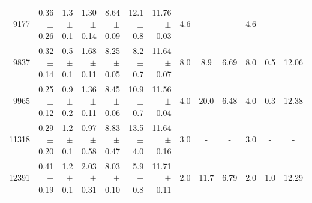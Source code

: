 \begin{table}
{\begin{tabular}{|r |r |r |r r |r r |c c c |c c c|}
 9177 & 0.36 $\pm$ 0.26 & 1.3 $\pm$ 0.1 &  1.30 $\pm$ 0.14 & 8.64 $\pm$ 0.09 & 12.1 $\pm$ 0.8 & 11.76 $\pm$ 0.03 & 4.6 &    - &    - & 4.6 &    - &     - \\
 9837 & 0.32 $\pm$ 0.14 & 0.5 $\pm$ 0.1 &  1.68 $\pm$ 0.11 & 8.25 $\pm$ 0.05 &  8.2 $\pm$ 0.7 & 11.64 $\pm$ 0.07 & 8.0 &  8.9 & 6.69 & 8.0 &  0.5 & 12.06 \\
 9965 & 0.25 $\pm$ 0.12 & 0.9 $\pm$ 0.2 &  1.36 $\pm$ 0.11 & 8.45 $\pm$ 0.06 & 10.9 $\pm$ 0.7 & 11.56 $\pm$ 0.04 & 4.0 & 20.0 & 6.48 & 4.0 &  0.3 & 12.38 \\
11318 & 0.29 $\pm$ 0.20 & 1.2 $\pm$ 0.1 &  0.97 $\pm$ 0.58 & 8.83 $\pm$ 0.47 & 13.5 $\pm$ 4.0 & 11.64 $\pm$ 0.16 & 3.0 &    - &    - & 3.0 &    - &     - \\
12391 & 0.41 $\pm$ 0.19 & 1.2 $\pm$ 0.1 &  2.03 $\pm$ 0.31 & 8.03 $\pm$ 0.10 &  5.9 $\pm$ 0.8 & 11.71 $\pm$ 0.11 & 2.0 & 11.7 & 6.79 & 2.0 &  1.0 & 12.29 \\
\hline
\end{tabular}
}
%
\end{table}

